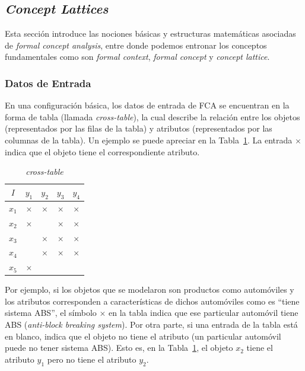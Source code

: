 \documentclass[12pt,oneside,letterpaper]{book}
\newcommand{\eng}[1]{\textit{#1}\xspace}			%
\newcommand{\abr}[1]{\textsc{#1}\xspace}           %
\theoremstyle{definition}
\begin{document}
\subsection{\eng{Concept Lattices}}
\label{sub:concept_lattices}
Esta sección introduce las nociones básicas y estructuras matemáticas asociadas de \eng{formal concept analysis}, entre donde podemos entronar los conceptos fundamentales como son \eng{formal context}, \eng{formal concept} y \eng{concept lattice}.

\subsubsection{Datos de Entrada}
\label{ssub:datos_de_entrada}
En una configuración básica, los datos de entrada de \abr{FCA} se encuentran en la forma de tabla (llamada \eng{cross-table}), la cual describe la relación entre los objetos (representados por las filas de la tabla) y atributos (representados por las columnas de la tabla). Un ejemplo se puede apreciar en la Tabla~\ref{tbl:cross_table}. La entrada $\times$ indica que el objeto tiene el correspondiente atributo.

\begin{table}[h!]
	\centering
	\begin{tabular}{|c|cccc|}
		\hline
		$I$		& $y_1$		& $y_2$ 	& $y_3$ 	& $y_4$ 	\\ \hline
		$x_1$	& $\times$	& $\times$	& $\times$ 	& $\times$ 	\\
		$x_2$	& $\times$	& 			& $\times$ 	& $\times$ 	\\
		$x_3$	& 			& $\times$	& $\times$ 	& $\times$ 	\\
		$x_4$	& 			& $\times$	& $\times$ 	& $\times$ 	\\
		$x_5$	& $\times$	& 			& 		 	& 		 	\\
		\hline
	\end{tabular}
	\caption{\eng{cross-table}}
	\label{tbl:cross_table}
\end{table}

\newpage
Por ejemplo, si los objetos que se modelaron son productos como automóviles y los atributos corresponden a características de dichos automóviles como es ``tiene sistema \abr{ABS}'', el símbolo $\times$ en la tabla indica que ese particular automóvil tiene \abr{ABS} (\eng{anti-block breaking system}). Por otra parte, si una entrada de la tabla está en blanco, indica que el objeto no tiene el atributo (un particular automóvil puede no tener sistema \abr{ABS}). Esto es, en la Tabla~\ref{tbl:cross_table}, el objeto $x_2$ tiene el atributo $y_1$ pero no tiene el atributo $y_2$.
\end{document}
